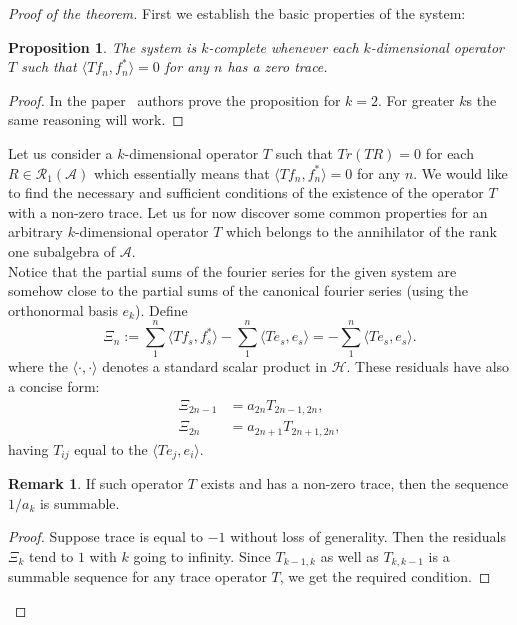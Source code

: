 \documentclass[12pt]{article}
\renewcommand{\cal}[1]{\mathcal{#1}}
\newtheorem{prop}{Proposition}
\theoremstyle{definition}
\newtheorem{remark}{Remark}
\numberwithin{remark}{section}
\numberwithin{theorem}{section}
\numberwithin{prop}{section}
\numberwithin{equation}{section}
\numberwithin{lemma}{section}
\numberwithin{prop_under_lemma}{lemma}
\begin{document}
    \begin{proof}[Proof of the theorem]
        First we establish the basic properties of the system:
        \begin{prop}
            The system is $k$-complete whenever each $k$-dimensional operator $T$ 
            such that $\langle Tf_n, f_n^* \rangle = 0$ for any $n$ has a zero trace.
        \end{prop}
        \begin{proof}
            In the paper~\cite{katavolos} authors prove the proposition for $k = 2$. For greater $k$s the same reasoning will work.
        \end{proof}
        Let us consider a $k$-dimensional operator $T$ such that 
        $Tr(TR) = 0$ for each $R \in \cal{R}_1(\cal{A})$ which essentially means that
        $\langle Tf_n, f_n^* \rangle = 0$ for any $n$. 
        We would like to find the necessary and sufficient conditions of the existence of the operator $T$ with a non-zero trace.
        Let us for now discover some common properties for an arbitrary $k$-dimensional operator $T$ which belongs to the annihilator of the rank one subalgebra of $\cal{A}$.\\
        Notice that the partial sums of the fourier series for the given system are somehow close to the
        partial sums of the canonical fourier series (using the orthonormal basis $e_k$). Define
        $$
          \Xi_n := \sum_1^n \langle Tf_s, f_s^* \rangle - \sum_1^n \langle Te_s, e_s \rangle = -\sum_1^n \langle Te_s, e_s \rangle.
        $$
        where the $\langle \cdot, \cdot\rangle$ denotes a standard scalar product in $\cal{H}$. 
        These residuals have also a concise form:
        \begin{align*}
            \Xi_{2n-1} &= a_{2n}T_{2n - 1, 2n},\\
            \Xi_{2n} &= a_{2n + 1}T_{2n + 1, 2n},
        \end{align*}
        having $T_{ij}$ equal to the $\langle Te_j, e_i \rangle$.
        \begin{remark}
            If such operator $T$ exists and has a non-zero trace, then the sequence $1/a_k$ is summable.
        \end{remark}
        \begin{proof}
            Suppose trace is equal to $-1$ without loss of generality.
            Then the residuals $\Xi_k$ tend to $1$ with $k$ going to infinity. Since $T_{k-1, k}$ as well as $T_{k, k-1}$
            is a summable sequence for any trace operator $T$, we get the required condition.

\end{proof}
\end{proof}
\end{document}
